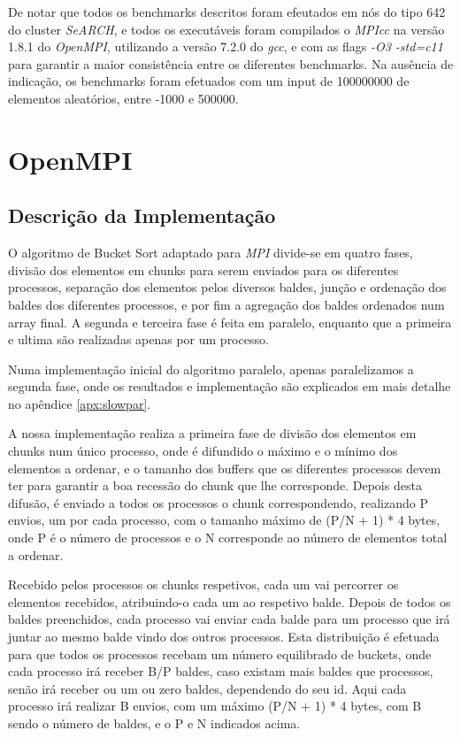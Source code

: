 \documentclass[a4paper]{report}
\begin{document}
De notar que todos os benchmarks descritos foram efeutados em nós do tipo 642 do
cluster \textit{SeARCH}, e todos os executáveis foram compilados o
\textit{MPIcc} na versão 1.8.1 do \textit{OpenMPI}, utilizando a versão
7.2.0 do \textit{gcc}, e com as flags \textit{-O3 -std=c11} para garantir
a maior consistência entre os diferentes benchmarks. Na
ausência de indicação, os benchmarks foram efetuados com um input de 100000000
de elementos aleatórios, entre -1000 e 500000.

\chapter{OpenMPI} \label{chap:ompi}

\section{Descrição da Implementação}
O algoritmo de Bucket Sort adaptado para \textit{MPI} divide-se em quatro fases,
divisão dos elementos em chunks para serem enviados para os diferentes
processos, separação dos elementos pelos diversos baldes, junção e ordenação dos
baldes dos diferentes processos, e por fim a agregação dos baldes ordenados num
array final. A segunda e terceira fase é feita em paralelo, enquanto que a
primeira e ultima são realizadas apenas por um processo.

Numa implementação inicial do algoritmo paralelo, apenas paralelizamos a
segunda fase, onde os resultados e implementação são explicados em mais detalhe
no apêndice \ref{apx:slowpar}.

A nossa implementação realiza a primeira fase de divisão dos elementos em chunks
num único processo, onde é difundido o máximo e o mínimo dos elementos a
ordenar, e o tamanho dos buffers que os diferentes processos devem ter para
garantir a boa recessão do chunk que lhe corresponde. Depois desta difusão, é
enviado a todos os processos o chunk correspondendo, realizando P envios, um por
cada processo, com o tamanho máximo de (P/N + 1) * 4 bytes, onde P é o número de
processos e o N corresponde ao número de elementos total a ordenar.

Recebido pelos processos os chunks respetivos, cada um vai percorrer os
elementos recebidos, atribuindo-o cada um ao respetivo balde. Depois de todos os
baldes preenchidos, cada processo vai enviar cada balde para um processo que
irá juntar ao mesmo balde vindo dos outros processos. Esta distribuição é
efetuada para que todos os processos recebam um número equilibrado de
buckets, onde cada processo irá receber B/P baldes, caso existam mais baldes
que processos, senão irá receber ou um ou zero baldes, dependendo do seu id.
Aqui cada processo irá realizar B envios, com um máximo (P/N + 1) * 4 bytes,
com B sendo o número de baldes, e o P e N indicados acima.
\end{document}
